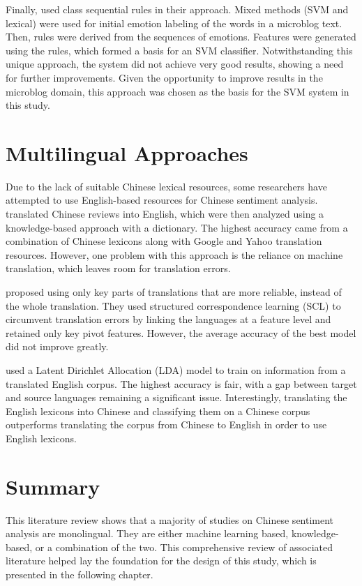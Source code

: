 \documentclass [11pt, proquest] {uwthesis}[2020/02/24]
\begin{document}
Finally, \cite{Wen2014} used class sequential rules in their approach. Mixed methods (SVM and lexical) were used for initial emotion labeling of the words in a microblog text. Then, rules were derived from the sequences of emotions. Features were generated using the rules, which formed a basis for an SVM classifier. Notwithstanding this unique approach, the system did not achieve very good results, showing a need for further improvements. Given the opportunity to improve results in the microblog domain, this approach was chosen as the basis for the SVM system in this study.
\section{Multilingual Approaches}
Due to the lack of suitable Chinese lexical resources, some researchers have attempted to use English-based resources for Chinese sentiment analysis. \cite{Wan2008} translated Chinese reviews into English, which were then analyzed using a knowledge-based approach with a dictionary. The highest accuracy came from a combination of Chinese lexicons along with Google and Yahoo translation resources. However, one problem with this approach is the reliance on machine translation, which leaves room for translation errors. 

\cite{Wei2010} proposed using only key parts of translations that are more reliable, instead of the whole translation. They used structured correspondence learning (SCL) to circumvent translation errors by linking the languages at a feature level and retained only key pivot features. However, the average accuracy of the best model did not improve greatly.

\cite{He2010} used a Latent Dirichlet Allocation (LDA) model to train on information from a translated English corpus. The highest accuracy is fair, with a gap between target and source languages remaining a significant issue. Interestingly, translating the English lexicons into Chinese and classifying them on a Chinese corpus outperforms translating the corpus from Chinese to English in order to use English lexicons.

\section{Summary}
This literature review shows that a majority of studies on Chinese sentiment analysis are monolingual. They are either machine learning based, knowledge-based, or a combination of the two. This comprehensive review of associated literature helped lay the foundation for the design of this study, which is presented in the following chapter. 
 
\end{document}
